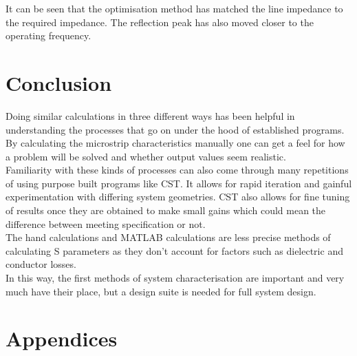 \documentclass{paper}
\begin{document}
It can be seen that the optimisation method has matched the line impedance to the required impedance. The reflection peak has also moved closer to the operating frequency.

\newpage
\section{Conclusion}
\label{sec:conclusion}
Doing similar calculations in three different ways has been helpful in understanding the processes that go on under the hood of established programs. By calculating the microstrip characteristics manually one can get a feel for how a problem will be solved and whether output values seem realistic. \\

Familiarity with these kinds of processes can also come through many repetitions of using purpose built programs like CST. It allows for rapid iteration and gainful experimentation with differing system geometries. CST also allows for fine tuning of results once they are obtained to make small gains which could mean the difference between meeting specification or not.\\

The hand calculations and MATLAB calculations are less precise methods of calculating S parameters as they don't account for factors such as dielectric and conductor losses. \\

In this way, the first methods of system characterisation are important and very much have their place, but a design suite is needed for full system design.

\newpage
\section{Appendices}
\end{document}
